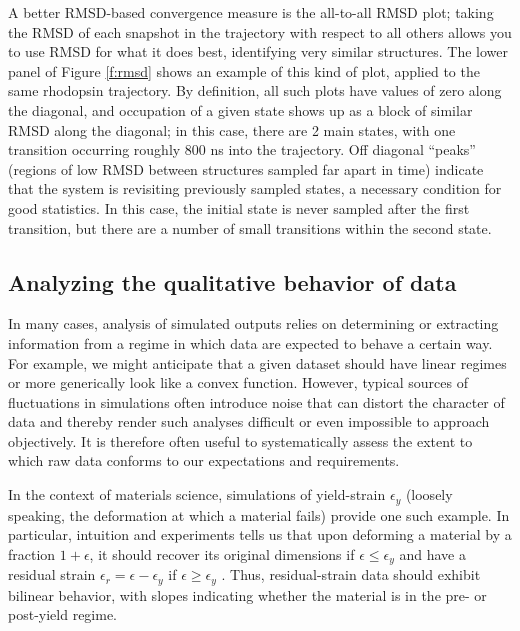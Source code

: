 A better RMSD-based convergence measure is the all-to-all RMSD plot; taking the
RMSD of each snapshot in the trajectory with respect to all others allows you to
use RMSD for what it does best, identifying very similar structures.  The lower
panel of Figure \ref{f:rmsd} shows an example of this kind of plot, applied to
the same rhodopsin trajectory.  By definition, all such plots have values of zero
along the diagonal, and occupation of a given state shows up as a block of
similar RMSD along the diagonal; in this case, there are 2 main states, with one
transition occurring roughly 800 ns into the trajectory.  Off diagonal ``peaks''
(regions of low RMSD between structures sampled far apart in time) indicate that
the system is revisiting previously sampled states, a necessary condition for
good statistics.  In this case, the initial state is never sampled after the
first transition, but there are a number of small transitions within the second
state.

\subsection{Analyzing the qualitative behavior of data}

In many cases, analysis of simulated outputs relies on determining or extracting information from a regime in which data are expected to behave a certain way.  For example, we might anticipate that a given dataset should have linear regimes or more generically look like a convex function.  However, typical sources of fluctuations in simulations often introduce noise that can distort the character of data and thereby render such analyses difficult or even impossible to approach objectively.  It is therefore often useful to systematically assess the extent to which raw data conforms to our expectations and requirements.

In the context of materials science, simulations of yield-strain $\epsilon_y$ (loosely speaking, the deformation at which a material fails) provide one such example.  In particular, intuition and experiments tells us that upon deforming a material by a fraction $1+\epsilon$, it should recover its original dimensions if $\epsilon \le \epsilon_y$ and have a residual strain $\epsilon_r = \epsilon - \epsilon_y$ if $\epsilon \ge \epsilon_y$ \cite{patrone2}.  Thus, residual-strain data should exhibit bilinear behavior, with slopes indicating whether the material is in the pre- or post-yield regime.

